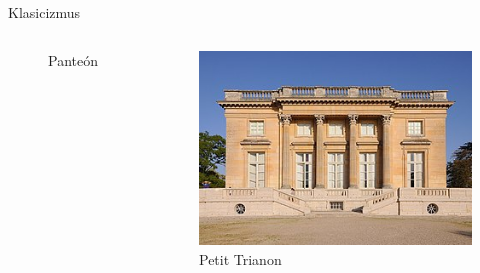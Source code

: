 \documentclass[dvipsnames]{beamer}
\begin{document}
\begin{frame}{Klasicizmus}
\begin{itemize}
\begin{columns}
\begin{figure}
				\caption{Panteón}
			\end{figure}
			\begin{figure}
				\includegraphics[scale=0.3]{maly}
				\caption{Petit Trianon}
			\end{figure}

		\end{columns}
	\end{itemize}
\end{frame}
\end{document}

